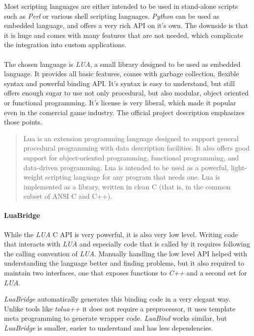 Most scripting languages are either intended to be used in stand-alone scripts such as \textit{Perl} or various shell scripting languages.
\textit{Python} can be used as  embedded language, and offers a very rich API on it's own.
The downside is that it is huge and comes with many features that are not needed, which complicate
the integration into custom applications.

\paragraph{}
The chosen language is \textit{LUA}\cite{lua}, a small library designed to be used as embedded language.
It provides all basic features, comes with garbage collection, flexible syntax and powerful binding API.
It's syntax is easy to understand, but still offers enough sugar to use not only procedural, but also modular, object oriented or functional programming.
It's license is very liberal, which made it popular even in the comercial game industry.
The official project description emphasizes those points.

\begin{quotation}
Lua is an extension programming language designed to support general procedural programming with data description facilities. It also offers good support for object-oriented programming, functional programming, and data-driven programming. Lua is intended to be used as a powerful, light-weight scripting language for any program that needs one. Lua is implemented as a library, written in clean C (that is, in the common subset of ANSI C and C++).
\end{quotation}

\paragraph{LuaBridge}
While the \textit{LUA} C API is very powerful, it is also very low level.
Writing code that interacts with \textit{LUA} and especially code that is called by it requires following the calling convention of \textit{LUA}.
Manually handling the low level API helped with understanding the language better and finding problems,
but it also required to maintain two interfaces, one that exposes functions to \textit{C++} and a second set for \textit{LUA}.

\textit{LuaBridge} automatically generates this binding code in a very elegant way.
Unlike tools like \textit{tolua++} it does not require a preprocessor,
it uses template meta programming to generate wrapper code.
\textit{LuaBind} works similar, but \textit{LuaBridge} is smaller, easier to understand and has less dependencies.

